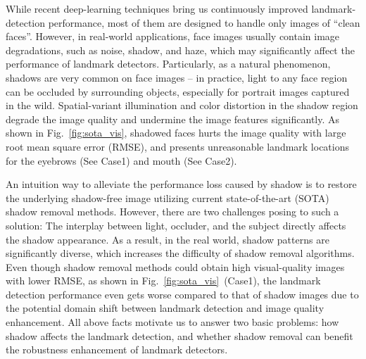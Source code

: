 \documentclass[10pt,twocolumn,letterpaper]{article}
\newcommand{\figref}[1]{Fig.~\ref{#1}}
\begin{document}
%

While recent deep-learning techniques bring us continuously improved landmark-detection performance, most of them are designed to handle only images of ``clean faces”. However, in real-world applications, face images usually contain image degradations, such as noise, shadow, and haze, which may significantly affect the performance of landmark detectors. Particularly, as a natural phenomenon, shadows are very common on face images – in practice, light to any face region can be occluded by surrounding objects, especially for portrait images captured in the wild. Spatial-variant illumination and color distortion in the shadow region \cite{fu2021auto} degrade the image quality and undermine the image features significantly. As shown in \figref{fig:sota_vis}, shadowed faces hurts the image quality with large root mean square error (RMSE), and presents unreasonable landmark locations for the eyebrows (See Case1) and mouth (See Case2). 

An intuition way to alleviate the performance loss caused by shadow is to restore the underlying shadow-free image utilizing current state-of-the-art (SOTA) shadow removal methods. However, there are two challenges posing to such a solution:  The interplay between light, occluder, and the subject directly affects the shadow appearance. As a result, in the real world, shadow patterns are significantly diverse, which increases the difficulty of shadow removal algorithms.  Even though shadow removal methods could obtain high visual-quality images with lower RMSE, as shown in \figref{fig:sota_vis}~(Case1), the landmark detection performance even gets worse compared to that of shadow images due to the potential domain shift between landmark detection and image quality enhancement.
%
All above facts motivate us to answer two basic problems: how shadow affects the landmark detection, and whether shadow removal can benefit the robustness enhancement of landmark detectors.
\end{document}

